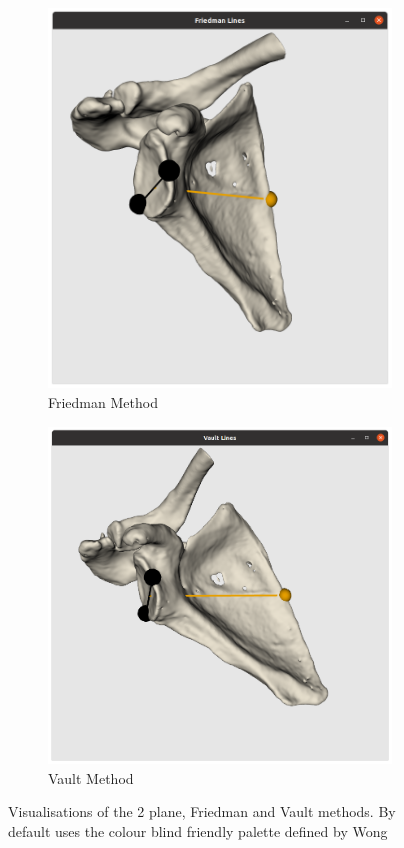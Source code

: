 \begin{figure}
\begin{center}
\begin{subfigure}[b]{0.28\linewidth}
			\includegraphics[width=\linewidth]{figures/friedman_vis.png}
			\caption{\label{fig:visfried}Friedman Method}
		\end{subfigure}	
                \begin{subfigure}[b]{0.31\linewidth}
			\includegraphics[width=\linewidth]{figures/vault_vis.png}
			\caption{\label{fig:visvault}Vault Method}
		\end{subfigure}	
	\end{center}
	\caption{\label{fig:visualisations}Visualisations of the 2 plane, Friedman and Vault methods. By default uses the colour blind friendly palette defined by Wong\cite{bang2011}}
\end{figure}

